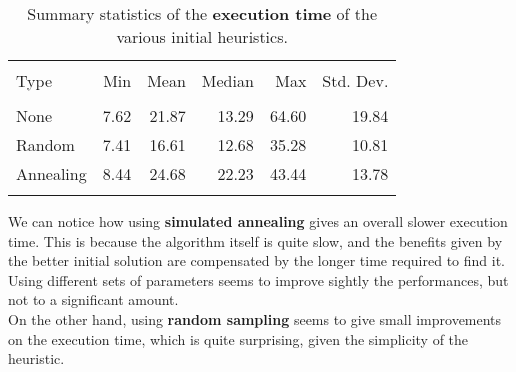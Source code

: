 \documentclass[
12pt,
a4paper,
oneside,
headinclude,
footinclude]{article}
\begin{document}
    \begin{table}[H]
        \centering
        \begin{tabular}{lrrrrr}
            \hline
            \\[-1.5ex]
            Type & Min & Mean & Median & Max & Std. Dev. \\ 
            [0.5ex]
            \hline
            \\[-1.5ex]
            None & 7.62 & 21.87 & 13.29 & 64.60 & 19.84 \\
            Random & 7.41 & 16.61 & 12.68 & 35.28 & 10.81 \\ 
            Annealing & 8.44 & 24.68 & 22.23 & 43.44 & 13.78 \\ 
            \\[-1.6ex]
            \hline
        \end{tabular}
        \caption{\label{heu}Summary statistics of the \textbf{execution time} of the various initial heuristics.}
    \end{table}
        
    We can notice how using \textbf{simulated annealing} gives an overall slower execution time. This is because the algorithm itself is quite slow, and the benefits given by the better initial solution are compensated by the longer time required to find it.\\
    Using different sets of parameters seems to improve sightly the performances, but not to a significant amount.\\ 
    On the other hand, using \textbf{random sampling} seems to give small improvements on the execution time, which is quite surprising, given the simplicity of the heuristic.
\end{document}
